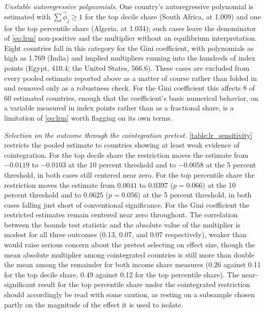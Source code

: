 \documentclass[12pt, titlepage]{article}
\numberwithin{equation}{section}
\begin{document}
\textit{Unstable autoregressive polynomials.} One country's autoregressive
polynomial is estimated with $\sum\hat\phi_{j} \geq 1$ for the top decile
share (South Africa, at 1.009) and one for the top percentile share (Algeria,
at 1.034); such cases leave the denominator of \eqref{eq:lrm} non-positive and
the multiplier without an equilibrium interpretation. Eight countries fall in
this category for the Gini coefficient, with polynomials as high as 1.769
(India) and implied multipliers running into the hundreds of index points
(Egypt, 410.4; the United States, 566.6). These cases are excluded from every pooled estimate reported above
as a matter of course rather than folded in and removed only as a robustness
check. For the Gini coefficient this affects 8 of 60 estimated countries,
enough that the coefficient's basic numerical behavior, on a variable measured
in index points rather than as a fractional share, is a limitation of
\eqref{eq:lrm} worth flagging on its own terms.

\textit{Selection on the outcome through the cointegration pretest.}
\autoref{table:lr_sensitivity} restricts the pooled estimate to countries
showing at least weak evidence of cointegration. For the top decile share the
restriction moves the estimate from $-0.0119$ to $-0.0103$ at the 10 percent
threshold and to $-0.0058$ at the 5 percent threshold, in both cases still
centered near zero. For the top percentile share the restriction moves the
estimate from $0.0041$ to $0.0397$ ($p=0.066$) at the 10 percent threshold and
to $0.0625$ ($p=0.056$) at the 5 percent threshold, in both cases falling just
short of conventional significance. For the Gini coefficient the restricted
estimates remain centered near zero throughout. The correlation between the
bounds test statistic and the absolute value of the multiplier is modest for
all three outcomes (0.13, 0.07, and 0.07 respectively), weaker than would raise
serious concern about the pretest selecting on effect size, though the mean
absolute multiplier among cointegrated countries is still more than double the
mean among the remainder for both income share measures (0.26 against 0.11 for
the top decile share, 0.49 against 0.12 for the top percentile share). The
near-significant result for the top percentile share under the cointegrated
restriction should accordingly be read with some caution, as resting on a
subsample chosen partly on the magnitude of the effect it is used to isolate.
\end{document}
